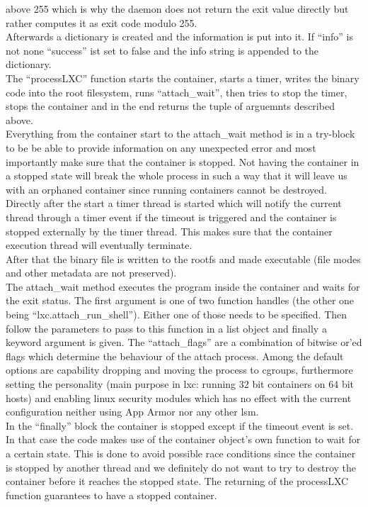 above 255 which is why the daemon does not return the exit value directly but rather computes it as exit code modulo
255.\\
Afterwards a dictionary is created and the information is put into it. If ``info'' is not none ``success'' ist set to false
and the info string is appended to the dictionary.\\
The ``processLXC'' function starts the container, starts a timer, writes the binary code into the root filesystem, runs
``attach\_wait'', then tries to stop the timer, stops the container and in the end returns the tuple of arguemnts
described above.\\
Everything from the container start to the attach\_wait method is in a try-block to be be able to provide information on
any unexpected error and most importantly make sure that the container is stopped. Not having the container in a stopped
state will break the whole process in such a way that it will leave us with an orphaned container since running containers
cannot be destroyed.\\
Directly after the start a timer thread is started which will notify the current thread through a timer event if the
timeout is triggered and the container is stopped externally by the timer thread. This makes sure that the container
execution thread will eventually terminate.\\
After that the binary file is written to the rootfs and made executable (file modes and other metadata are not preserved).\\
The attach\_wait method executes the program inside the container and waits for the exit status\cite{attachwait}. The first argument is
one of two function handles (the other one being ``lxc.attach\_run\_shell''). Either one of those needs to be specified. Then
follow the parameters to pass to this function in a list object and finally a keyword argument is given. The
``attach\_flags'' are a combination of bitwise or'ed flags which determine the behaviour of the attach process. Among
the default options are capability dropping and moving the process to cgroups, furthermore setting the personality
(main purpose in lxc: running 32 bit containers on 64 bit hosts)\cite{personality} and enabling linux security modules
which has no effect with the current configuration neither using App Armor nor any other lsm.\\
In the ``finally'' block the container is stopped except if the timeout event is set. In that case the code makes use of
the container object's own function to wait for a certain state. This is done to avoid possible race conditions since
the container is stopped by another thread and we definitely do not want to try to destroy the container before it
reaches the stopped state. The returning of the processLXC function guarantees to have a stopped container.